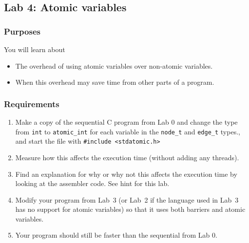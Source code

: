 \documentclass{forsete}
\begin{document}
\newpage
\subsection*{Lab 4: Atomic variables}
\subsubsection*{Purposes}
You will learn about
\begin{itemize}
\item The overhead of using atomic variables over non-atomic variables.
\item When this overhead may save time from other parts of a program.
\end{itemize}

\subsubsection*{Requirements}
\begin{enumerate}
\item Make a copy of the sequential C program from Lab 0 and change the
type from \verb.int. to \verb.atomic_int. for each variable in the 
\verb.node_t. and \verb.edge_t. types., and start the file with \verb!#include <stdatomic.h>!
\item Measure how this affects the execution time (without adding any threads).
\item Find an explanation for why or why not this affects the execution time by looking at the 
assembler code. See hint for this lab. 

\item Modify your program from Lab~3 (or Lab~2 if the language used in Lab~3 has no support for atomic variables)
so that it uses both barriers and atomic variables.
\item Your program should still be faster than the sequential from Lab 0.
\end{enumerate}
\end{document}
